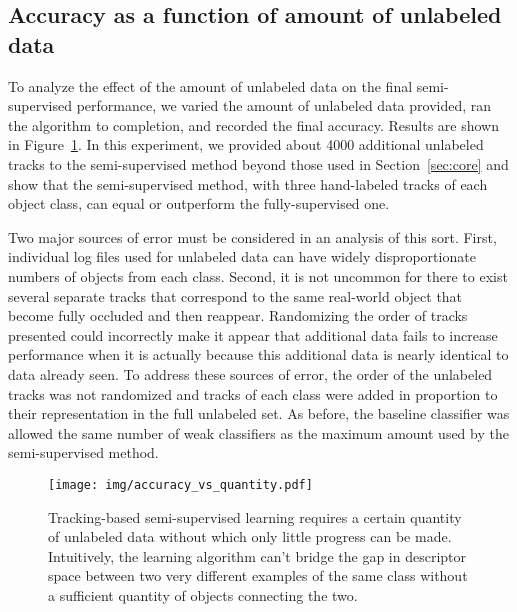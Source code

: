 \documentclass[conference]{IEEEtran}
\begin{document}
\subsection{Accuracy as a function of amount of unlabeled data}

To analyze the effect of the amount of unlabeled data on the final semi-supervised performance, we varied the amount of unlabeled data provided, ran the algorithm to completion, and recorded the final accuracy.  Results are shown in Figure~\ref{fig:quantity}.  In this experiment, we provided about 4000 additional unlabeled tracks to the semi-supervised method beyond those used in Section~\ref{sec:core} and show that the semi-supervised method, with three hand-labeled tracks of each object class, can equal or outperform the fully-supervised one.

Two major sources of error must be considered in an analysis of this sort.  First, individual log files used for unlabeled data can have widely disproportionate numbers of objects from each class.  Second, it is not uncommon for there to exist several separate tracks that correspond to the same real-world object that become fully occluded and then reappear.  Randomizing the order of tracks presented could incorrectly make it appear that additional data fails to increase performance when it is actually because this additional data is nearly identical to data already seen.  To address these sources of error, the order of the unlabeled tracks was not randomized and tracks of each class were added in proportion to their representation in the full unlabeled set.  As before, the baseline classifier was allowed the same number of weak classifiers as the maximum amount used by the semi-supervised method.

\begin{figure}
  \centering
  \texttt{[image: img/accuracy\_vs\_quantity.pdf]}
  \caption{Tracking-based semi-supervised learning requires a certain quantity of unlabeled data without which only little progress can be made.  Intuitively, the learning algorithm can't bridge the gap in descriptor space between two very different examples of the same class without a sufficient quantity of objects connecting the two.}
  \label{fig:quantity}
\end{figure}
\end{document}
